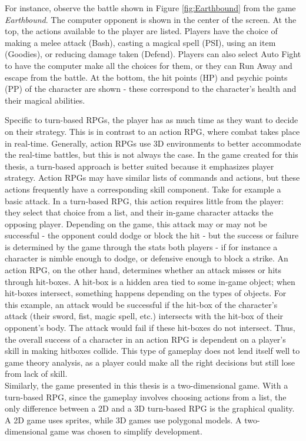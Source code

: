 For instance, observe the battle shown in Figure \ref{fig:Earthbound} from the game \textit{Earthbound}. The computer opponent is shown in the center of the screen. At the top, the actions available to the player are listed. Players have the choice of making a melee attack (Bash), casting a magical spell (PSI), using an item (Goodies), or reducing damage taken (Defend). Players can also select Auto Fight to have the computer make all the choices for them, or they can Run Away and escape from the battle. At the bottom, the hit points (HP) and psychic points (PP) of the character are shown - these correspond to the character's health and their magical abilities.

Specific to turn-based RPGs, the player has as much time as they want to decide on their strategy. This is in contrast to an action RPG, where combat takes place in real-time. Generally, action RPGs use 3D environments to better accommodate the real-time battles, but this is not always the case. In the game created for this thesis, a turn-based approach is better suited because it emphasizes player strategy. Action RPGs may have similar lists of commands and actions, but these actions frequently have a corresponding skill component. Take for example a basic attack. In a turn-based RPG, this action requires little from the player: they select that choice from a list, and their in-game character attacks the opposing player. Depending on the game, this attack may or may not be successful - the opponent could dodge or block the hit - but the success or failure is determined by the game through the stats both players - if for instance a character is nimble enough to dodge, or defensive enough to block a strike. An action RPG, on the other hand, determines whether an attack misses or hits through hit-boxes. A hit-box is a hidden area tied to some in-game object; when hit-boxes intersect, something happens depending on the types of objects. For this example, an attack would be successful if the hit-box of the character's attack (their sword, fist, magic spell, etc.) intersects with the hit-box of their opponent's body. The attack would fail if these hit-boxes do not intersect. Thus, the overall success of a character in an action RPG is dependent on a player's skill in making hitboxes collide. This type of gameplay does not lend itself well to game theory analysis, as a player could make all the right decisions but still lose from lack of skill.\\

Similarly, the game presented in this thesis is a two-dimensional game. With a turn-based RPG, since the gameplay involves choosing actions from a list, the only difference between a 2D and a 3D turn-based RPG is the graphical quality. A 2D game uses sprites, while 3D games use polygonal models. A two-dimensional game was chosen to simplify development.\\

